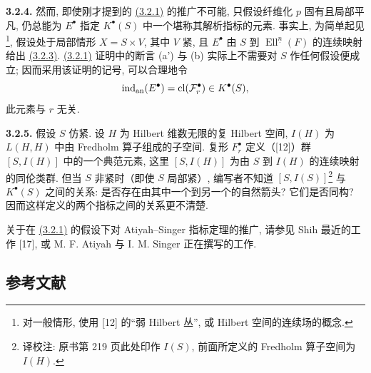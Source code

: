 \textbf{3.2.4.} 然而, 即使刚才提到的 \hyperlink{sga6.e02.thm.3-2-1}{(3.2.1)} 的推广不可能, 只假设纤维化 $p$ 固有且局部平凡, 仍总能为 $E^\bullet$ 指定 $K^{\bullet}(S)$ 中一个堪称其解析指标的元素. 事实上, 为简单起见\footnote{对一般情形, 使用 [12] 的“弱 Hilbert 丛”, 或 Hilbert 空间的连续场的概念.}, 假设处于局部情形 $X=S\times V$, 其中 $V$ 紧, 且 $E^\bullet$ 由 $S$ 到 $\operatorname{Ell}^{\underline n}(F)$ 的连续映射给出 \hyperlink{sga6.e02.para.3-2-3}{(3.2.3)}. \hyperlink{sga6.e02.thm.3-2-1}{(3.2.1)} 证明中的断言 (a') 与 (b) 实际上不需要对 $S$ 作任何假设便成立; 因而采用该证明的记号, 可以合理地令
\[
 \operatorname{ind}_{\mathrm{an}}(E^\bullet)=\operatorname{cl}(\mathcal F_r^\bullet)\in K^{\bullet}(S),
\]
此元素与 $r$ 无关.

\textbf{3.2.5.} 假设 $S$ 仿紧. 设 $H$ 为 Hilbert 维数无限的复 Hilbert 空间, $I(H)$ 为 $L(H,H)$ 中由 Fredholm 算子组成的子空间. 复形 $F_r^\bullet$ 定义（[12]）群 $[S,I(H)]$ 中的一个典范元素, 这里 $[S,I(H)]$ 为由 $S$ 到 $I(H)$ 的连续映射的同伦类群. 但当 $S$ 非紧时（即使 $S$ 局部紧）, 编写者不知道 $[S,I(S)]$\footnote{译校注: 原书第 219 页此处印作 \(I(S)\), 前面所定义的 Fredholm 算子空间为 \(I(H)\).} 与 $K^{\bullet}(S)$ 之间的关系: 是否存在由其中一个到另一个的自然箭头? 它们是否同构? 因而这样定义的两个指标之间的关系更不清楚.

关于在 \hyperlink{sga6.e02.thm.3-2-1}{(3.2.1)} 的假设下对 Atiyah--Singer 指标定理的推广, 请参见 Shih 最近的工作 [17], 或 M. F. Atiyah 与 I. M. Singer 正在撰写的工作.

\subsection*{参考文献}

